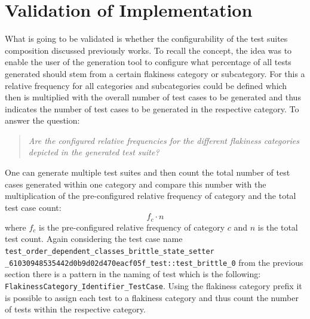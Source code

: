 \documentclass[
fancyheadings, %
%
%
]{stsreprt}
\begin{document}
\section{Validation of Implementation}
What is going to be validated is whether the configurability of the test suites composition discussed previously works. To recall the concept, the idea was to enable the user of the generation tool to configure what percentage of all tests generated should stem from a certain flakiness category or subcategory. For this a relative frequency for all categories and subcategories could be defined which then is multiplied with the overall number of test cases to be generated and thus indicates the number of test cases to be generated in the respective category. To answer the question: 
\begin{quote}\emph{Are the configured relative frequencies for the different flakiness categories depicted in the generated test suite?}\end{quote}
One can generate multiple test suites and then count the total number of test cases generated within one category and compare this number with the multiplication of the pre-configured relative frequency of category and the total test case count:
\[
    f_c \cdot n
\]
where $f_c$ is the pre-configured relative frequency of category $c$ and $n$ is the total test count. Again considering the test case name \lstinline{test_order_dependent_classes_brittle_state_setter _61030948535442d0b9d02d470eacf05f_test::test_brittle_0} from the previous section there is a pattern in the naming of test which is the following: \lstinline{FlakinessCategory_Identifier_TestCase}.
Using the flakiness category prefix it is possible to assign each test to a flakiness category and thus count the number of tests within the respective category. 
\end{document}
